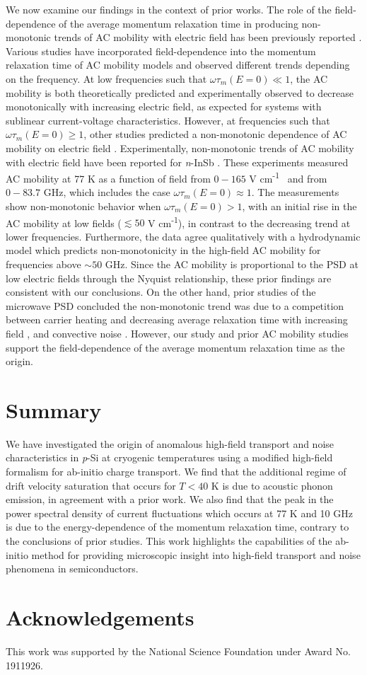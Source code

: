 \documentclass[aps,prx,preprint,letterpaper,groupedaddress,longbibliography]{revtex4-2}
\theoremstyle{definition}
\newcommand{\smalleunits}{V cm\textsuperscript{-1}}
\begin{document}
We now examine our findings in the context of prior works. The role of the field-dependence of the average momentum relaxation time in producing non-monotonic trends of AC mobility with electric field has been previously reported \cite{Bonek:1972}. Various studies have incorporated field-dependence into the momentum relaxation time of AC mobility models and observed different trends depending on the frequency. At low frequencies such that $\omega\tau_m(E=0)\ll1$, the AC mobility is both theoretically predicted \cite{Gibson:1961,Paranjape:1961} and experimentally observed \cite{Glover:1973} to decrease monotonically with increasing electric field, as expected for systems with sublinear current-voltage characteristics. However, at frequencies such that $\omega\tau_m(E=0)\geq 1$, other studies predicted a non-monotonic dependence of AC mobility on electric field \cite{Mukhopadhyay:1969,Seeger:1973}. Experimentally, non-monotonic trends of AC mobility with electric field have been reported for \textit{n}-InSb \cite{Bonek:1970,Bonek:1972}. These experiments measured AC mobility at 77 K as a function of field from $0-165$ \smalleunits~ and from $0-83.7$ GHz, which includes the case $\omega\tau_m(E=0)\approx 1$. The measurements show non-monotonic behavior when $\omega\tau_m(E=0)>1$, with an initial rise in the AC mobility at low fields ($\lesssim 50$ \smalleunits), in contrast to the decreasing trend at lower frequencies. Furthermore, the data agree qualitatively with a hydrodynamic model \cite{Bonek:1970} which predicts non-monotonicity in the high-field AC mobility for frequencies above $\sim 50$ GHz. Since the AC mobility is proportional to the PSD at low electric fields through the Nyquist relationship, these prior findings are consistent with our conclusions. On the other hand, prior studies of the microwave PSD concluded the non-monotonic trend was due to a competition between carrier heating and decreasing average relaxation time with increasing field \cite{Bareikis:1981}, and convective noise \cite{Hartnagel:2001}. However, our study and prior AC mobility studies support the field-dependence of the average momentum relaxation time as the origin.


\section{Summary}

We have investigated the origin of anomalous high-field transport and noise characteristics in \textit{p}-Si at cryogenic temperatures using a modified high-field formalism for ab-initio charge transport. We find that the additional regime of drift velocity saturation that occurs for $T<40$ K is due to acoustic phonon emission, in agreement with a prior work. We also find that the peak in the power spectral density of current fluctuations which occurs at 77 K and 10 GHz is due to the energy-dependence of the momentum relaxation time, contrary to the conclusions of prior studies. This work highlights the capabilities of the ab-initio method for providing microscopic insight into high-field transport and noise phenomena in semiconductors.

\section*{Acknowledgements}

This work was supported by the National Science Foundation under Award No. 1911926.


\end{document}
